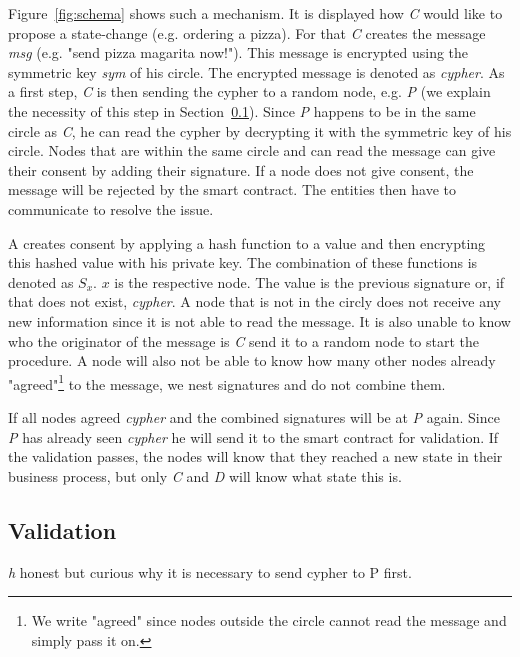 \documentclass[runningheads]{llncs}
\newcommand{\ber}[1]{\textit{#1}}
\newcommand{\reffig}[1]{Figure~\ref{#1}}
\newcommand{\refsec}[1]{Section~\ref{#1}}
\begin{document}
\reffig{fig:schema} shows such a mechanism. It is displayed how \ber{C} would like to propose a state-change (e.g. ordering a pizza). For that \ber{C} creates the message \ber{msg} (e.g. "send pizza magarita now!"). This message is encrypted using the symmetric key \ber{sym} of his circle. The encrypted message is denoted as \ber{cypher}. As a first step, \ber{C} is then sending the cypher to a random node, e.g. \ber{P} (we explain the necessity of this step in \refsec{subsec:furtherinfo}). Since \ber{P} happens to be in the same circle as \ber{C}, he can read the cypher by decrypting it with the symmetric key of his circle. Nodes that are within the same circle and can read the message can give their consent by adding their signature. If a node does not give consent, the message will be rejected by the smart contract. The entities then have to communicate to resolve the issue. 


A creates consent by applying a hash function to a value and then encrypting this hashed value with his private key. The combination of these functions is denoted as $S_x$. $x$ is the respective node. The value is the previous signature or, if that does not exist, \ber{cypher}. A node that is not in the circly does not receive any new information since it is not able to read the message. It is also unable to know who the originator of the message is \ber{C} send it to a random node to start the procedure. A node will also not be able to know how many other nodes already "agreed"\footnote{We write "agreed" since nodes outside the circle cannot read the message and simply pass it on.} to the message, we nest signatures and do not combine them.


If all nodes agreed \ber{cypher} and the combined signatures will be at \ber{P} again. Since \ber{P} has already seen \ber{cypher} he will send it to the smart contract for validation. If the validation passes, the nodes will know that they reached a new state in their business process, but only \ber{C} and \ber{D} will know what state this is.




\subsection{Validation} \label{subsec:furtherinfo}

\ber{h} honest but curious
why it is necessary to send cypher to P first.
\end{document}
